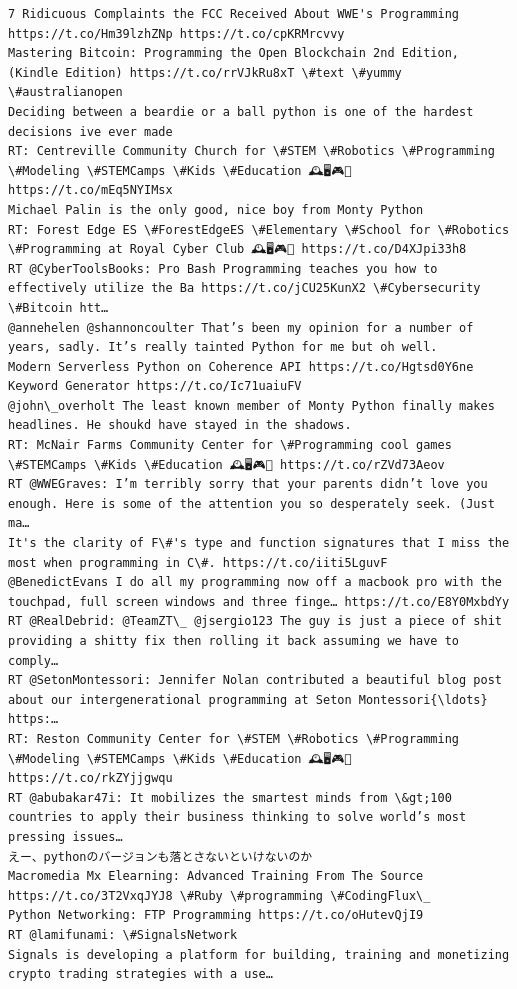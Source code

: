 \documentclass[11pt]{article}
\begin{document}
\begin{Verbatim}[commandchars=\\\{\}]
7 Ridicuous Complaints the FCC Received About WWE's Programming https://t.co/Hm39lzhZNp https://t.co/cpKRMrcvvy
Mastering Bitcoin: Programming the Open Blockchain 2nd Edition, (Kindle Edition) https://t.co/rrVJkRu8xT \#text \#yummy \#australianopen
Deciding between a beardie or a ball python is one of the hardest decisions ive ever made
RT: Centreville Community Church for \#STEM \#Robotics \#Programming \#Modeling \#STEMCamps \#Kids \#Education 🕰️🖥️🎮💎 https://t.co/mEq5NYIMsx
Michael Palin is the only good, nice boy from Monty Python
RT: Forest Edge ES \#ForestEdgeES \#Elementary \#School for \#Robotics \#Programming at Royal Cyber Club 🕰️🖥️🎮💎 https://t.co/D4XJpi33h8
RT @CyberToolsBooks: Pro Bash Programming teaches you how to effectively utilize the Ba https://t.co/jCU25KunX2 \#Cybersecurity \#Bitcoin htt…
@annehelen @shannoncoulter That’s been my opinion for a number of years, sadly. It’s really tainted Python for me but oh well.
Modern Serverless Python on Coherence API https://t.co/Hgtsd0Y6ne
Keyword Generator https://t.co/Ic71uaiuFV
@john\_overholt The least known member of Monty Python finally makes headlines. He shoukd have stayed in the shadows.
RT: McNair Farms Community Center for \#Programming cool games \#STEMCamps \#Kids \#Education 🕰️🖥️🎮💎 https://t.co/rZVd73Aeov
RT @WWEGraves: I’m terribly sorry that your parents didn’t love you enough. Here is some of the attention you so desperately seek. (Just ma…
It's the clarity of F\#'s type and function signatures that I miss the most when programming in C\#. https://t.co/iiti5LguvF
@BenedictEvans I do all my programming now off a macbook pro with the touchpad, full screen windows and three finge… https://t.co/E8Y0MxbdYy
RT @RealDebrid: @TeamZT\_ @jsergio123 The guy is just a piece of shit providing a shitty fix then rolling it back assuming we have to comply…
RT @SetonMontessori: Jennifer Nolan contributed a beautiful blog post about our intergenerational programming at Seton Montessori{\ldots} https:…
RT: Reston Community Center for \#STEM \#Robotics \#Programming \#Modeling \#STEMCamps \#Kids \#Education 🕰️🖥️🎮💎 https://t.co/rkZYjjgwqu
RT @abubakar47i: It mobilizes the smartest minds from \&gt;100 countries to apply their business thinking to solve world’s most pressing issues…
えー、pythonのバージョンも落とさないといけないのか
Macromedia Mx Elearning: Advanced Training From The Source  https://t.co/3T2VxqJYJ8 \#Ruby \#programming \#CodingFlux\_
Python Networking: FTP Programming https://t.co/oHutevQjI9
RT @lamifunami: \#SignalsNetwork
Signals is developing a platform for building, training and monetizing crypto trading strategies with a use…

\end{Verbatim}
\end{document}
